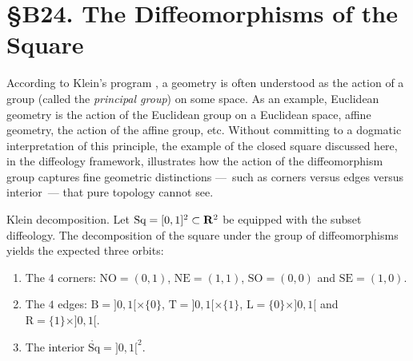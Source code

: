 
\chapter*{\S B24. The Diffeomorphisms of the Square}
\setcounter{footnote}{0}


\begin{abstract}
  In this note we shall see how diffeology,
  understood as the geometry of the group of diffeomorphisms in the sense of Felix Klein,
  fulfills its duty concerning the full square $\text{Sq} = [0,1]^2 \subset \RR^2$.
\end{abstract}


\vspace{-1em}
According to Klein's program \cite{Kle72},
a geometry is often understood as the action of a group (called the {\em principal group}) on some space.
As an example, Euclidean geometry is the action of the Euclidean group on a Euclidean space,
affine geometry,
the action of the affine group, etc.
Without committing to a dogmatic interpretation of this principle,
the example of the closed square discussed here,
in the diffeology framework,
illustrates how the action of the diffeomorphism group captures fine geometric distinctions
---~such as corners versus edges versus interior~---
that pure topology cannot see.

\begin{Article}{Klein decomposition.}{}
  Let $\text{Sq} = [0,1]^2 \subset \RR^2$ be equipped with the subset diffeology.
  The decomposition of the square under the group of diffeomorphisms yields the expected three orbits:
  
  \begin{enumerate}
    \item The $4$ corners: $\text{NO}=(0,1)$,
    $\text{NE}=(1,1)$,
    $\text{SO}=(0,0)$ and $\text{SE}=(1,0)$.
    \item The $4$ edges: $\text{B} = ]0,1[ \times \{0\}$,
    $\text{T} = ]0,1[ \times \{1\}$,
    $\text{L} = \{0\} \times ]0,1[$ and $\text{R} = \{1\} \times ]0,1[$.
    \item The interior $\mathring{\text{Sq}} = ]0,1[^2$.
  \end{enumerate}
\end{Article}

